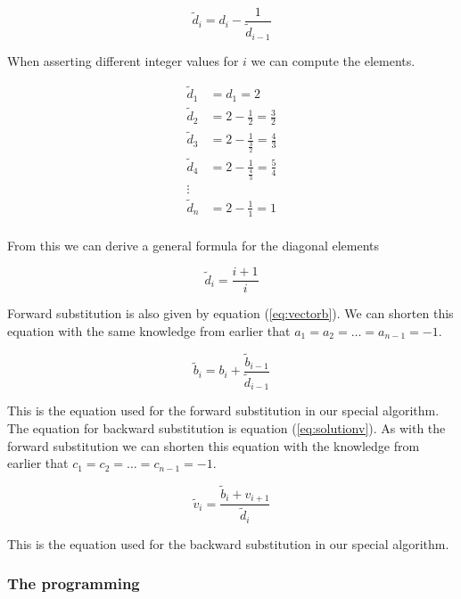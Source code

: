 \documentclass{article}
\begin{document}
    \begin{equation*}
      \tilde{d}_i = d_i - \frac{1}{\tilde{d}_{i-1}}
    \end{equation*}

    When asserting different integer values for $i$ we can compute the elements.

    \begin{align*}
      \tilde{d}_1 &= d_1 = 2 \\
      \tilde{d}_2 &= 2 - \frac{1}{2} = \frac{3}{2} \\
      \tilde{d}_3 &= 2 - \frac{1}{\frac{3}{2}} = \frac{4}{3} \\
      \tilde{d}_4 &= 2 - \frac{1}{\frac{4}{3}} = \frac{5}{4} \\
      \vdots \\
      \tilde{d}_n &= 2 - \frac{1}{1} = 1 \\
    \end{align*}

    From this we can derive a general formula for the diagonal elements

    \begin{equation*}
      \tilde{d}_i = \frac{i+1}{i}
    \end{equation*}

    Forward substitution is also given by equation (\ref{eq:vectorb}). We can shorten this equation with the same knowledge from earlier that $a_1 = a_2 = \hdots = a_{n-1} = -1$.

    \begin{equation*}
      \tilde{b}_i = b_i + \frac{\tilde{b}_{i-1}}{\tilde{d}_{i-1}} \label{eq:vectorbspec}
    \end{equation*}

    This is the equation used for the forward substitution in our special algorithm. \\

    The equation for backward substitution is equation (\ref{eq:solutionv}). As with the forward substitution we can shorten this equation with the knowledge from earlier that $c_1 = c_2 = \hdots = c_{n-1} = -1$.

    \begin{equation*}
      \tilde{v}_i = \frac{\tilde{b}_i + v_{i+1}}{\tilde{d}_i}
    \end{equation*}

    This is the equation used for the backward substitution in our special algorithm.

  \subsubsection{The programming}
\end{document}
